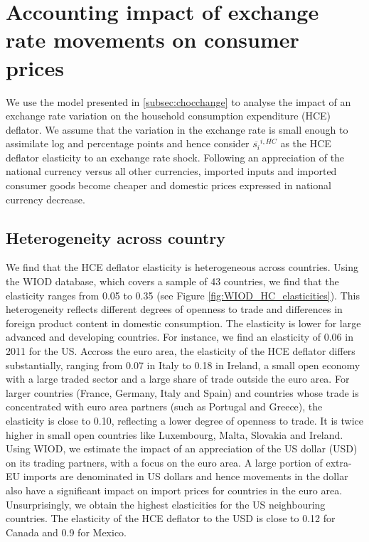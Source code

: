 \documentclass[12pt,a4paper]{paper}
\begin{document}
\section{Accounting impact of exchange rate movements on consumer prices}
\label{sec:prixconso}
We use the model presented in \ref{subsec:chocchange} to analyse the impact of an exchange rate variation on the household consumption expenditure (HCE) deflator.
We assume that the variation in the exchange rate is small enough to assimilate log and percentage points and hence consider $\overline{s_{i}}^{i,HC}$ as the HCE deflator elasticity to an exchange rate shock. Following an appreciation of the national currency versus all other currencies, imported inputs and imported consumer goods become cheaper and domestic prices expressed in national currency decrease. 
\subsection{Heterogeneity across country}\label{subsec:heterogcountry}
We find that the HCE deflator elasticity is heterogeneous across countries.  
Using the WIOD database, which covers a sample of 43 countries, we find that the elasticity ranges from 0.05 to 0.35  (see Figure \ref{fig:WIOD_HC_elasticities}). 
This heterogeneity reflects different degrees of openness to trade and differences in foreign product content in domestic consumption. 
The elasticity is lower for large advanced and developing countries.
For instance, we find an elasticity of 0.06 in 2011 for the US. 
Accross the euro area, the elasticity of the HCE deflator differs substantially, ranging from 0.07 in Italy to 0.18 in Ireland, a small open economy with a large traded sector and a large share of trade outside the euro area. 
For larger countries (France, Germany, Italy and Spain) and countries whose trade is concentrated with euro area partners (such as Portugal and Greece), the elasticity is close to 0.10, reflecting a lower degree of openness to trade.  
It is twice higher in small open countries like Luxembourg, Malta, Slovakia and Ireland.\\
Using WIOD, we estimate the impact of an appreciation of the US dollar (USD) on its trading partners, with a focus on the euro area.
A large portion of extra-EU imports are denominated in US dollars and hence movements in the dollar also have a significant impact on import prices for countries in
the euro area.
Unsurprisingly, we obtain the highest elasticities for the US neighbouring countries. 
The elasticity of the HCE deflator to the USD is close to 0.12 for Canada and 0.9 for Mexico.
 
\end{document}
